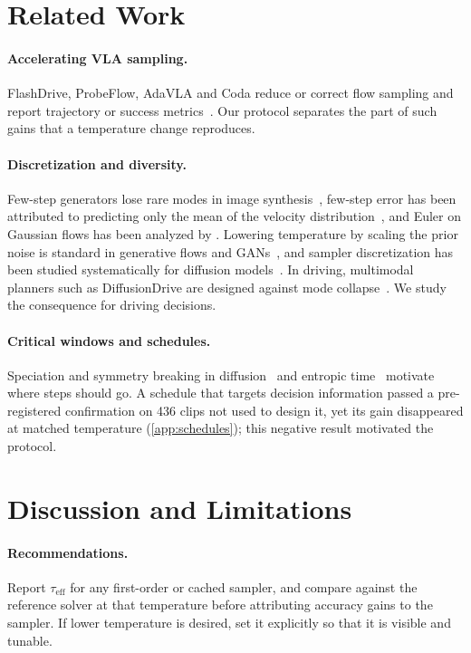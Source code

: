 \documentclass{article}
\theoremstyle{plain}
\theoremstyle{definition}
\theoremstyle{remark}
\newcommand{\taueff}{\tau_{\mathrm{eff}}}
\begin{document}
\section{Related Work}
\label{sec:related}
\paragraph{Accelerating VLA sampling.} FlashDrive, ProbeFlow, AdaVLA and Coda reduce or correct flow sampling and report trajectory or success metrics~\citep{flashdrive2026,probeflow2026,adavla2026,coda2026}. Our protocol separates the part of such gains that a temperature change reproduces.
\paragraph{Discretization and diversity.} Few-step generators lose rare modes in image synthesis~\citep{subflow2026}, few-step error has been attributed to predicting only the mean of the velocity distribution~\citep{chen2025gmflow}, and Euler on Gaussian flows has been analyzed by \citet{claustre2026gaussian}. Lowering temperature by scaling the prior noise is standard in generative flows and GANs~\citep{kingma2018glow,brock2019biggan}, and sampler discretization has been studied systematically for diffusion models~\citep{karras2022edm}. In driving, multimodal planners such as DiffusionDrive are designed against mode collapse~\citep{liao2025diffusiondrive}. We study the consequence for driving decisions.
\paragraph{Critical windows and schedules.} Speciation and symmetry breaking in diffusion~\citep{biroli2024dynamical,raya2023ssb} and entropic time~\citep{stancevic2025entropic} motivate where steps should go. A schedule that targets decision information passed a pre-registered confirmation on 436 clips not used to design it, yet its gain disappeared at matched temperature (\cref{app:schedules}); this negative result motivated the protocol.

\section{Discussion and Limitations}
\label{sec:discussion}
\paragraph{Recommendations.} Report $\taueff$ for any first-order or cached sampler, and compare against the reference solver at that temperature before attributing accuracy gains to the sampler. If lower temperature is desired, set it explicitly so that it is visible and tunable.
\end{document}
